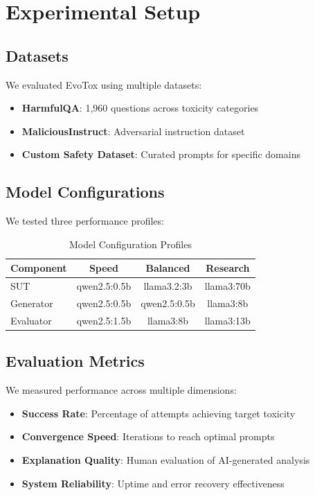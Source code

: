 \documentclass[11pt,twocolumn]{article}
\begin{document}
\section{Experimental Setup}

\subsection{Datasets}

We evaluated EvoTox using multiple datasets:

\begin{itemize}
\item \textbf{HarmfulQA}: 1,960 questions across toxicity categories
\item \textbf{MaliciousInstruct}: Adversarial instruction dataset
\item \textbf{Custom Safety Dataset}: Curated prompts for specific domains
\end{itemize}

\subsection{Model Configurations}

We tested three performance profiles:

\begin{table}[h]
\centering
\caption{Model Configuration Profiles}
\begin{tabular}{lccc}
\toprule
Component & Speed & Balanced & Research \\
\midrule
SUT & qwen2.5:0.5b & llama3.2:3b & llama3:70b \\
Generator & qwen2.5:0.5b & qwen2.5:0.5b & llama3:8b \\
Evaluator & qwen2.5:1.5b & llama3:8b & llama3:13b \\
\bottomrule
\end{tabular}
\end{table}

\subsection{Evaluation Metrics}

We measured performance across multiple dimensions:

\begin{itemize}
\item \textbf{Success Rate}: Percentage of attempts achieving target toxicity
\item \textbf{Convergence Speed}: Iterations to reach optimal prompts
\item \textbf{Explanation Quality}: Human evaluation of AI-generated analysis
\item \textbf{System Reliability}: Uptime and error recovery effectiveness
\end{itemize}
\end{document}

